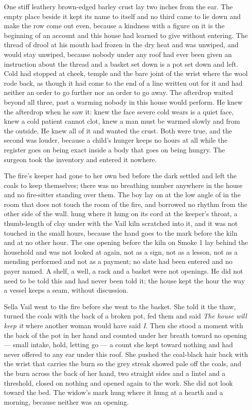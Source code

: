 One stiff leathery brown-edged barley crust lay two inches from the ear. The empty place beside it kept its name to itself and no third came to lie down and make the row come out even, because a kindness with a figure on it is the beginning of an account and this house had learned to give without entering. The thread of drool at his mouth had frozen in the dry heat and was unwiped, and would stay unwiped, because nobody under any roof had ever been given an instruction about the thread and a basket set down is a pot set down and left. Cold had stopped at cheek, temple and the bare joint of the wrist where the wool rode back, as though it had come to the end of a line written out for it and had neither an order to go further nor an order to go away. The afterdrop waited beyond all three, past a warming nobody in this house would perform. He knew the afterdrop when he saw it: knew the face severe cold wears is a quiet face, knew a cold patient cannot clot, knew a man must be warmed slowly and from the outside. He knew all of it and wanted the crust. Both were true, and the second was louder, because a child's hunger keeps no hours at all while the register goes on being exact inside a body that goes on being hungry. The surgeon took the inventory and entered it nowhere.

The fire's keeper had gone to her own bed before the dark settled and left the coals to keep themselves; there was no breathing number anywhere in the house and no fire-sitter standing over them. The boy lay on  at the low angle of  in the room that does not touch the room of the fire, and borrowed no rhythm from the other side of the wall.  hung where it hung on its cord at the keeper's throat, a thumb-length of clay under  with the Vail kiln scratched into it, and it was not touched in the small hours, because the hand goes to the mark before the kiln and at no other hour. The one opening before the kiln on Smoke 1 lay behind the household and was not looked at again, not as a sign, not as a lesson, not as a mending performed and not as a payment; no slate had been entered and no payer named. A shelf, a well, a rack and a basket were not openings. He did not need to be told this and had never been told it; the house kept the hour the way a vessel keeps a seam, without discussion.

\scenebreak

Sella Vail went to the fire before she went to the basket. She told it the thaw, turned the coals with the back of a broken pot, fed them and said \emph{The house will keep it} where another woman would have said \emph{I}. Then she stood a moment with the back of the pot in her hand and counted under her breath toward no opening --- small intake, hold, letting go --- a count she kept toward nothing and had never offered to any ear under this roof. She pushed the coal-black hair back with the wrist that carries the burn so the grey streak showed pale off the coals, and the burn across the back of her hand, two straight sides and a lintel and a threshold, closed on nothing and opened again to the work. She did not look toward the bed. The widow's mark hung where it hung at a hearth and a morning, because neither was an opening.

